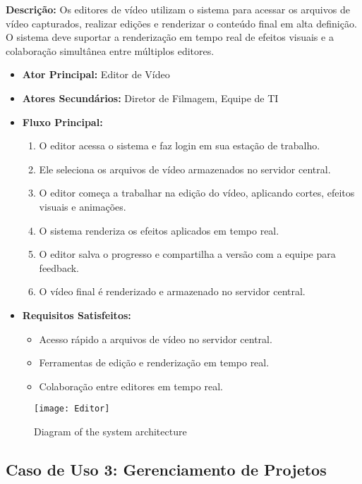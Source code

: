 \textbf{Descrição:} Os editores de vídeo utilizam o sistema para acessar os arquivos de vídeo capturados, realizar edições e renderizar o conteúdo final em alta definição. O sistema deve suportar a renderização em tempo real de efeitos visuais e a colaboração simultânea entre múltiplos editores.

\begin{itemize}
  \item \textbf{Ator Principal:} Editor de Vídeo
  \item \textbf{Atores Secundários:} Diretor de Filmagem, Equipe de TI
  \item \textbf{Fluxo Principal:}
    \begin{enumerate}
      \item O editor acessa o sistema e faz login em sua estação de trabalho.
      \item Ele seleciona os arquivos de vídeo armazenados no servidor central.
      \item O editor começa a trabalhar na edição do vídeo, aplicando cortes, efeitos visuais e animações.
      \item O sistema renderiza os efeitos aplicados em tempo real.
      \item O editor salva o progresso e compartilha a versão com a equipe para feedback.
      \item O vídeo final é renderizado e armazenado no servidor central.
    \end{enumerate}
  \item \textbf{Requisitos Satisfeitos:}
    \begin{itemize}
      \item Acesso rápido a arquivos de vídeo no servidor central.
      \item Ferramentas de edição e renderização em tempo real.
      \item Colaboração entre editores em tempo real.
    \end{itemize}
\end{itemize}

\begin{figure}[ht]
    \centering
    \texttt{[image: Editor]}
    \caption{Diagram of the system architecture}
    \label{fig:diagram1}
\end{figure}

\subsection{Caso de Uso 3: Gerenciamento de Projetos}

